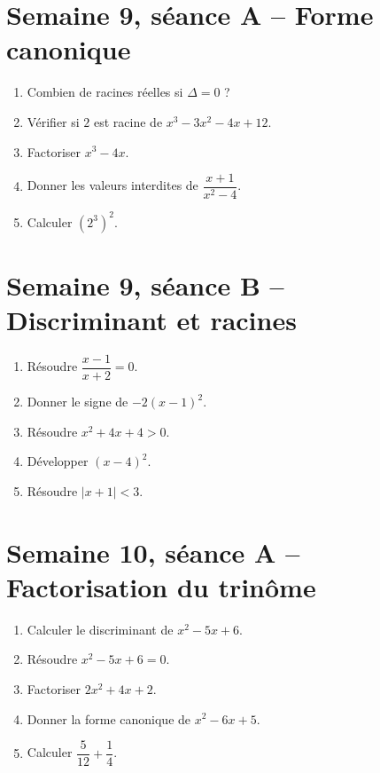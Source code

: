 \section{Semaine 9, séance A -- Forme canonique}
\begin{enumerate}
  \item Combien de racines réelles si $\Delta=0$ ?
  \item Vérifier si $2$ est racine de $x^3-3x^2-4x+12$.
  \item Factoriser $x^3-4x$.
  \item Donner les valeurs interdites de $\dfrac{x+1}{x^2-4}$.
  \item Calculer $(2^3)^2$.
\end{enumerate}

\section{Semaine 9, séance B -- Discriminant et racines}
\begin{enumerate}
  \item Résoudre $\dfrac{x-1}{x+2}=0$.
  \item Donner le signe de $-2(x-1)^2$.
  \item Résoudre $x^2+4x+4>0$.
  \item Développer $(x-4)^2$.
  \item Résoudre $|x+1|<3$.
\end{enumerate}
\TeacherOnly{%
\begin{tcolorbox}[colback=VE!3,colframe=VE!35,boxrule=.4pt,arc=1mm]
\small\textit{Réponses.}\quad \textbf{1.} $x=1$. \quad \textbf{2.} Négatif ou nul. \quad \textbf{3.} $\R\setminus\{-2\}$. \quad \textbf{4.} $x^2-8x+16$. \quad \textbf{5.} $x\in]-4;2[$.
\end{tcolorbox}}

\section{Semaine 10, séance A -- Factorisation du trinôme}
\begin{enumerate}
  \item Calculer le discriminant de $x^2-5x+6$.
  \item Résoudre $x^2-5x+6=0$.
  \item Factoriser $2x^2+4x+2$.
  \item Donner la forme canonique de $x^2-6x+5$.
  \item Calculer $\dfrac{5}{12}+\dfrac14$.
\end{enumerate}

